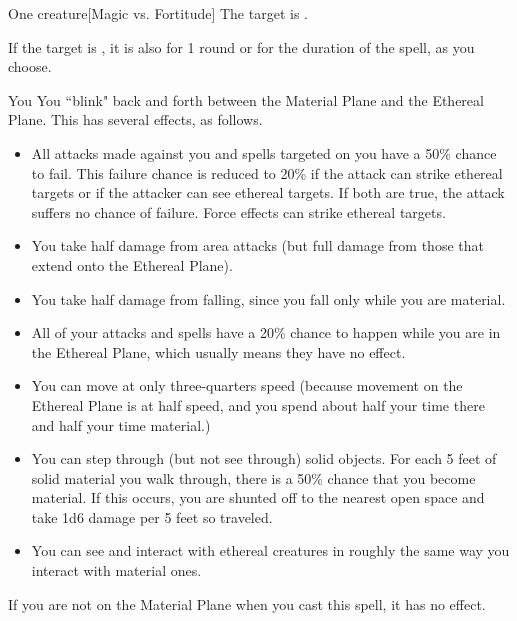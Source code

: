 \spellrng{\rngmed}
\spelldur{\durshort \dismissable}
\begin{spelltarget}{One creature}[Magic vs. Fortitude]
    \spellsuccess The target is \sickened.

    If the target is \bloodied, it is also \blinded for 1 round or \deafened for the duration of the spell, as you choose.
\end{spelltarget}

\spellrng{\rngpers}
\spelldur{\durshort \dismissable}
\begin{spelltarget}{You}
    \spelleffect You ``blink" back and forth between the Material Plane and the Ethereal Plane. This has several effects, as follows.
    \begin{itemize}
        \item All attacks made against you and spells targeted on you have a 50\% chance to fail. This failure chance is reduced to 20\% if the attack can strike ethereal targets or if the attacker can see ethereal targets. If both are true, the attack suffers no chance of failure. Force effects can strike ethereal targets.
        \item You take half damage from area attacks (but full damage from those that extend onto the Ethereal Plane).
        \item You take half damage from falling, since you fall only while you are material.
        \item All of your attacks and spells have a 20\% chance to happen while you are in the Ethereal Plane, which usually means they have no effect.
        \item You can move at only three-quarters speed (because movement on the Ethereal Plane is at half speed, and you spend about half your time there and half your time material.)
        \item You can step through (but not see through) solid objects. For each 5 feet of solid material you walk through, there is a 50\% chance that you become material. If this occurs, you are shunted off to the nearest open space and take 1d6 damage per 5 feet so traveled. 
        \item You can see and interact with ethereal creatures in roughly the same way you interact with material ones.
    \end{itemize}
\end{spelltarget}
\spellnotes If you are not on the Material Plane when you cast this spell, it has no effect.

